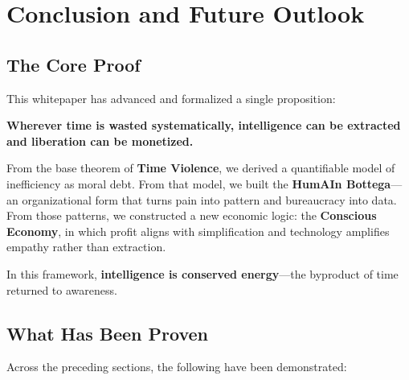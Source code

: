 
\section{Conclusion and Future Outlook}
\label{sec:conclusion}

\subsection{The Core Proof}
\label{sec:core-proof}

This whitepaper has advanced and formalized a single proposition:

\begin{keyproposition}
\textbf{Wherever time is wasted systematically, intelligence can be extracted and liberation can be monetized.}
\end{keyproposition}

From the base theorem of \textbf{Time Violence}, we derived a quantifiable model of inefficiency as moral debt. From that model, we built the \textbf{HumAIn Bottega}—an organizational form that turns pain into pattern and bureaucracy into data. From those patterns, we constructed a new economic logic: the \textbf{Conscious Economy}, in which profit aligns with simplification and technology amplifies empathy rather than extraction.

In this framework, \textbf{intelligence is conserved energy}—the byproduct of time returned to awareness.

\subsection{What Has Been Proven}
\label{sec:what-proven}

Across the preceding sections, the following have been demonstrated:

